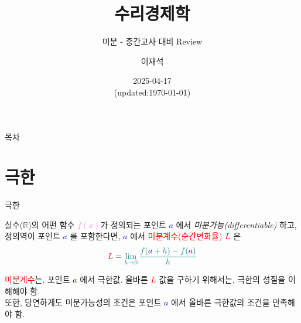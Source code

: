 \documentclass[aspectratio=169]{beamer}
\title{수리경제학}
\subtitle{미분 - 중간고사 대비 Review}
\author{이재석}
\date{2025-04-17 \\ (updated:\today)}
\begin{document}
\begin{frame}
  \titlepage
\end{frame}

\begin{frame}{목차}
  \tableofcontents
\end{frame}






\section{극한}

\begin{frame}{극한}
  \begin{definition}[도함수]
    실수($\mathbb{R}$)의 어떤 함수 \textcolor{violet}{$f(x)$}가 정의되는 포인트 \textcolor{blue}{\emph{$a$}} 에서 \emph{미분가능(differentiable)} 하고, 정의역이 포인트 \textcolor{blue}{\emph{$a$}} 를 포함한다면, \textcolor{blue}{\emph{$a$}} 에서 \textcolor{red}{미분계수(순간변화율)} \textcolor{red}{\emph{$L$}} 은 \\
    \begin{equation}
      \textcolor{red}{L} = \textcolor{teal}{\lim_{h \to 0} \frac{f(\textcolor{blue}{a}+h)-f(\textcolor{blue}{a})}{h}}
    \end{equation}
  \end{definition}
  \textcolor{red}{미분계수}는, 포인트 \textcolor{blue}{\emph{$a$}} 에서 극한값. 올바른 \textcolor{red}{$L$} 값을 구하기 위해서는, 극한의 성질을 이해해야 함. \\또한, 당연하게도 미분가능성의 조건은 포인트 \textcolor{blue}{\emph{$a$}} 에서 올바른 극한값의 조건을 만족해야 함.
\end{frame}
\end{document}
